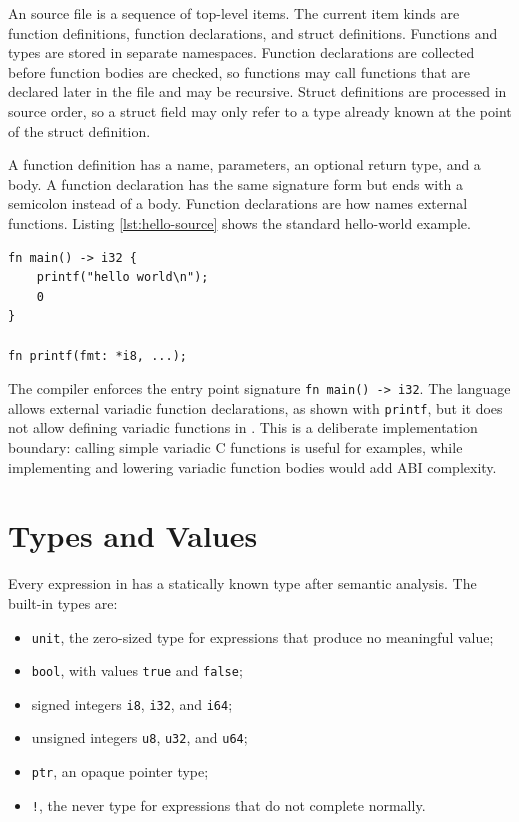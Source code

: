 An \epl{} source file is a sequence of top-level items. The current item kinds
are function definitions, function declarations, and struct definitions.
Functions and types are stored in separate namespaces. Function declarations are
collected before function bodies are checked, so functions may call functions
that are declared later in the file and may be recursive. Struct definitions are
processed in source order, so a struct field may only refer to a type already
known at the point of the struct definition.

A function definition has a name, parameters, an optional return type, and a
body. A function declaration has the same signature form but ends with a
semicolon instead of a body. Function declarations are how \epl{} names external
functions. Listing \ref{lst:hello-source} shows the standard hello-world
example.

\begin{lstlisting}[language=EPL,caption={Hello world in EPL},label={lst:hello-source}]
fn main() -> i32 {
	printf("hello world\n");
	0
}

fn printf(fmt: *i8, ...);
\end{lstlisting}

The compiler enforces the entry point signature \texttt{fn main() -> i32}. The
language allows external variadic function declarations, as shown with
\texttt{printf}, but it does not allow defining variadic functions in \epl{}.
This is a deliberate implementation boundary: calling simple variadic C
functions is useful for examples, while implementing and lowering variadic
\epl{} function bodies would add ABI complexity.

\section{Types and Values}

Every expression in \epl{} has a statically known type after semantic analysis.
The built-in types are:

\begin{itemize}
  \item \texttt{unit}, the zero-sized type for expressions that produce no
        meaningful value;
  \item \texttt{bool}, with values \texttt{true} and \texttt{false};
  \item signed integers \texttt{i8}, \texttt{i32}, and \texttt{i64};
  \item unsigned integers \texttt{u8}, \texttt{u32}, and \texttt{u64};
  \item \texttt{ptr}, an opaque pointer type;
  \item \texttt{!}, the never type for expressions that do not complete
        normally.
\end{itemize}

